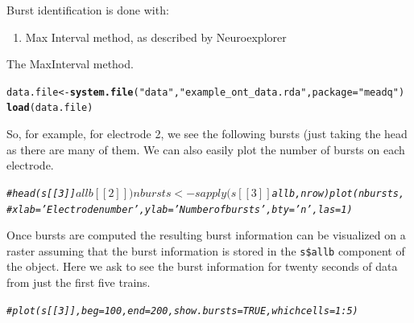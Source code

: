 \documentclass{article}\usepackage[]{graphicx}\usepackage[]{color}
\makeatletter
\newcommand{\hlstr}[1]{\textcolor[rgb]{0.192,0.494,0.8}{#1}}%
\newcommand{\hlcom}[1]{\textcolor[rgb]{0.678,0.584,0.686}{\textit{#1}}}%
\newcommand{\hlstd}[1]{\textcolor[rgb]{0.345,0.345,0.345}{#1}}%
\newcommand{\hlkwb}[1]{\textcolor[rgb]{0.69,0.353,0.396}{#1}}%
\newcommand{\hlkwc}[1]{\textcolor[rgb]{0.333,0.667,0.333}{#1}}%
\newcommand{\hlkwd}[1]{\textcolor[rgb]{0.737,0.353,0.396}{\textbf{#1}}}%
\newenvironment{kframe}{%
 \def\at@end@of@kframe{}%
 \ifinner\ifhmode%
  \def\at@end@of@kframe{\end{minipage}}%
  \begin{minipage}{\columnwidth}%
 \fi\fi%
 \def\FrameCommand##1{\hskip\@totalleftmargin \hskip-\fboxsep
 \colorbox{shadecolor}{##1}\hskip-\fboxsep
     \hskip-\linewidth \hskip-\@totalleftmargin \hskip\columnwidth}%
 \MakeFramed {\advance\hsize-\width
   \@totalleftmargin\z@ \linewidth\hsize
   \@setminipage}}%
 {\par\unskip\endMakeFramed%
 \at@end@of@kframe}
\newenvironment{knitrout}{}{} %
\makeatother
\begin{document}
Burst identification is done with:
\begin{enumerate}
\item Max Interval method, as described by Neuroexplorer \citep{neuroexplorer}

\end{enumerate}

The MaxInterval method.
\begin{knitrout}
\color{fgcolor}\begin{kframe}
\begin{alltt}
\hlstd{data.file} \hlkwb{<-} \hlkwd{system.file}\hlstd{(}\hlstr{"data"}\hlstd{,} \hlstr{"example_ont_data.rda"}\hlstd{,} \hlkwc{package} \hlstd{=} \hlstr{"meadq"}\hlstd{)}
\hlkwd{load}\hlstd{(data.file)}
\end{alltt}


{\ttfamily\noindent\color{warningcolor}{\#\# Warning: cannot open compressed file '', probable reason 'Invalid argument'}}

{\ttfamily\noindent\bfseries\color{errorcolor}{\#\# Error: cannot open the connection}}\end{kframe}
\end{knitrout}


So, for example, for electrode 2, we see the following bursts (just
taking the head as there are many of them.  We can also easily plot
the number of bursts on each electrode.

\begin{knitrout}
\color{fgcolor}\begin{kframe}
\begin{alltt}
\hlcom{# head(s[[3]]$allb[[2]]) nbursts <- sapply(s[[3]]$allb, nrow) plot(nbursts,}
\hlcom{# xlab='Electrode number', ylab='Number of bursts', bty='n', las=1)}
\end{alltt}
\end{kframe}
\end{knitrout}



Once bursts are computed the resulting burst information can be
visualized on a raster assuming that the burst information is stored
in the \verb+s$allb+ component of the object.  Here we ask to see the
burst information for twenty seconds of data from just the first five trains.

\begin{knitrout}
\color{fgcolor}\begin{kframe}
\begin{alltt}
\hlcom{# plot(s[[3]], beg=100, end=200, show.bursts=TRUE, whichcells=1:5)}
\end{alltt}
\end{kframe}
\end{knitrout}
\end{document}
